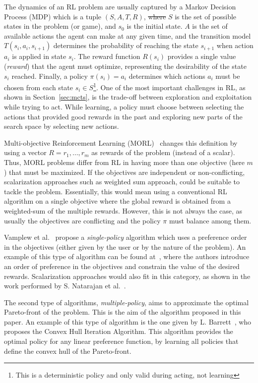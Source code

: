 \documentclass[journal]{IEEEtran}
\providecommand{\DIFaddtex}[1]{{\protect\color{blue}\uwave{#1}}} %
\providecommand{\DIFdeltex}[1]{{\protect\color{red}\sout{#1}}}                      %
\providecommand{\DIFaddbegin}{} %
\providecommand{\DIFaddend}{} %
\providecommand{\DIFdelbegin}{} %
\providecommand{\DIFdelend}{} %
\providecommand{\DIFadd}[1]{\texorpdfstring{\DIFaddtex{#1}}{#1}} %
\providecommand{\DIFdel}[1]{\texorpdfstring{\DIFdeltex{#1}}{}} %
\begin{document}
The dynamics of an RL problem are usually captured by a Markov Decision Process (MDP) which is a tuple $(S, A, T, R)$, \DIFdelbegin \DIFdel{where }\DIFdelend \DIFaddbegin \DIFadd{in which }\DIFaddend $S$ is the set of possible states in the problem (or game), and $s_0$ is the initial state. $A$ is the set of available actions the agent can make at any given time, and the transition model $T(s_i, a_i, s_{i+1})$ determines the probability of reaching the state $s_{i+1}$ when action $a_i$ is applied in state $s_i$. The reward function $R(s_i)$ provides a single value (\textit{reward}) that the agent must optimize, representing the desirability of the state $s_i$ reached. Finally, a policy $\pi(s_i) = a_i$ determines which actions $a_i$ must be chosen from each state $s_i \in S$\footnote{This is a deterministic policy and only valid during acting, not learning}. One of the most important challenges in RL, as shown in Section~\ref{sec:mcts}, is the trade-off between exploration and exploitation while trying to act. While learning, a policy must choose between selecting the actions that provided good rewards in the past and exploring new parts of the search space by selecting new actions. 

Multi-objective Reinforcement Learning (MORL)~\cite{Vamplew2010} changes this definition by using a vector $R = {r_1, \dots, r_m}$ as rewards of the problem (instead of a scalar). Thus, MORL problems differ from RL in having more than one objective (here $m$) that must be maximized. If the objectives are independent or non-conflicting, scalarization approaches such as \DIFaddbegin \DIFadd{the }\DIFaddend weighted sum approach, could be suitable to tackle the problem. Essentially, this would mean using a conventional RL algorithm on a single objective where the global reward is obtained from a weighted-sum of the multiple rewards. However, this is not always the case, as usually the objectives are conflicting and the policy $\pi$ must balance among them.

Vamplew et al.~\cite{Vamplew2010} propose a \textit{single-policy} algorithm which uses a preference order in the objectives (either given by the user or by the nature of the problem). 
An example of this type of algorithm can be found at~\cite{Gabor1998}, where the authors introduce an order of preference in the objectives and constrain the value of the desired rewards. Scalarization approaches would also fit in this category, as shown in the work performed by S. Natarajan et al.~\cite{Natarajan2005}.

The second type of algorithms, \textit{multiple-policy}, aims to approximate the optimal Pareto-front of the problem. This is the aim of the algorithm proposed in this paper. An example of this type of algorithm is the one given by L. Barrett~\cite{Barrett2008}, who proposes the Convex Hull Iteration Algorithm. This algorithm provides the optimal policy for any linear preference function, by learning all policies that define the convex hull of the Pareto-front.
\end{document}
